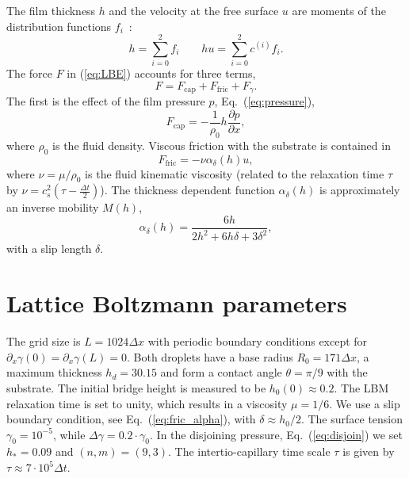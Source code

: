 \documentclass[twocolumn,amsmath,amssymb,showpacs,nofootinbib,prfluids,superscriptaddress]{revtex4-2} %
\begin{document}
The film thickness $h$ and the velocity at the free surface $u$ are moments of the distribution functions $f_i$~\cite{Salmon:1999:0022-2402:503, PhysRevE.65.036309, PhysRevE.104.034801}:
\begin{equation}\label{eq:hydrofields}
    h= \sum_{i=0}^2 f_i \qquad hu = \sum_{i=0}^2 c^{(i)} f_i.
\end{equation}
The force $F$ in (\ref{eq:LBE}) accounts for three terms,
\begin{equation}\label{eq:force}
    F = F_{\text{cap}} + F_{\text{fric}} + F_{\gamma}.  
\end{equation}
The first is the effect of the film pressure $p$, Eq.~(\ref{eq:pressure}), 
\begin{equation}\label{eq:capillary_force}
    F_{\text{cap}} = -\frac{1}{\rho_0} h \frac{\partial p}{\partial x},
\end{equation}
where $\rho_0$ is the fluid density. 
Viscous friction with the substrate is contained in
\begin{equation}\label{eq:fric_force}
    F_{\text{fric}} = -\nu \alpha_{\delta}(h) u,
\end{equation}
where $\nu=\mu/\rho_0$ is the fluid kinematic viscosity (related to the relaxation time $\tau$ by $\nu = c_s^2\left(\tau-\frac{\Delta t}{2}\right)$).
The thickness dependent function $\alpha_{\delta}(h)$ is approximately an inverse mobility $M(h)$,
\begin{equation}\label{eq:fric_alpha}
     \alpha_{\delta}(h) = \frac{6 h}{2h^2 + 6h\delta + 3\delta^2},
\end{equation}
with a slip length $\delta$.

\section{Lattice Boltzmann parameters}\label{app:one}
The grid size is $L=1024\Delta x$ with periodic boundary conditions except for $\partial_x\gamma(0) = \partial_x\gamma(L) = 0$.
Both droplets have a base radius $R_0 = 171\Delta x$, a maximum thickness $h_d = 30.15$ and form a contact angle $\theta = \pi/9$ with the substrate.
The initial bridge height is measured to be $h_0(0) \approx 0.2$.
The LBM relaxation time is set to unity, which results in a viscosity $\mu = 1/6$. 
We use a slip boundary condition, see Eq.~(\ref{eq:fric_alpha}), with $\delta \approx h_0/2$.
The surface tension $\gamma_0 = 10^{-5}$, while $\Delta\gamma = 0.2\cdot \gamma_0$.
In the disjoining pressure, Eq.~(\ref{eq:disjoin}) we set $h_{\ast} = 0.09$ and $(n,m) = (9,3)$.
The intertio-capillary time scale $\tau$ is given by $\tau \approx 7\cdot 10^5 \Delta t$. 


\end{document}
